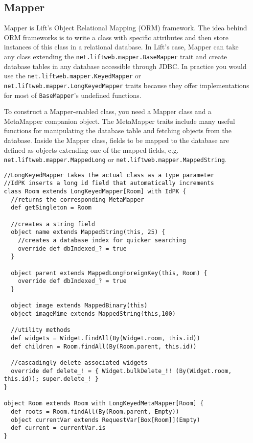 \subsection{Mapper}

Mapper is Lift's Object Relational Mapping (ORM) framework. The idea behind ORM frameworks is to write a class with specific attributes and then store instances of this class in a relational database. In Lift's case, Mapper can take any class extending the \lstinline!net.liftweb.mapper.BaseMapper! trait and create database tables in any database accessible through JDBC. In practice you would use the \lstinline!net.liftweb.mapper.KeyedMapper! or \lstinline!net.liftweb.mapper.LongKeyedMapper! traits because they offer implementations for most of \lstinline!BaseMapper!'s undefined functions.

To construct a Mapper-enabled class, you need a Mapper class and a MetaMapper companion object. The MetaMapper traits include many useful functions for manipulating the database table and fetching objects from the database. Inside the Mapper class, fields to be mapped to the database are defined as objects extending one of the mapped fields, e.g. \lstinline!net.liftweb.mapper.MappedLong! or \lstinline!net.liftweb.mapper.MappedString!.

\begin{lstlisting}[caption=Lift Mapper: Room.scala,label=lst:lift:mapper]
//LongKeyedMapper takes the actual class as a type parameter
//IdPK inserts a long id field that automatically increments
class Room extends LongKeyedMapper[Room] with IdPK {
  //returns the corresponding MetaMapper
  def getSingleton = Room
   
  //creates a string field
  object name extends MappedString(this, 25) {
    //creates a database index for quicker searching
    override def dbIndexed_? = true
  }
   
  object parent extends MappedLongForeignKey(this, Room) {
    override def dbIndexed_? = true
  } 
  
  object image extends MappedBinary(this)
  object imageMime extends MappedString(this,100)
  
  //utility methods
  def widgets = Widget.findAll(By(Widget.room, this.id))
  def children = Room.findAll(By(Room.parent, this.id))
  
  //cascadingly delete associated widgets
  override def delete_! = { Widget.bulkDelete_!! (By(Widget.room, this.id)); super.delete_! }
}  
 
object Room extends Room with LongKeyedMetaMapper[Room] {
  def roots = Room.findAll(By(Room.parent, Empty))
  object currentVar extends RequestVar[Box[Room]](Empty)
  def current = currentVar.is
}
\end{lstlisting}



